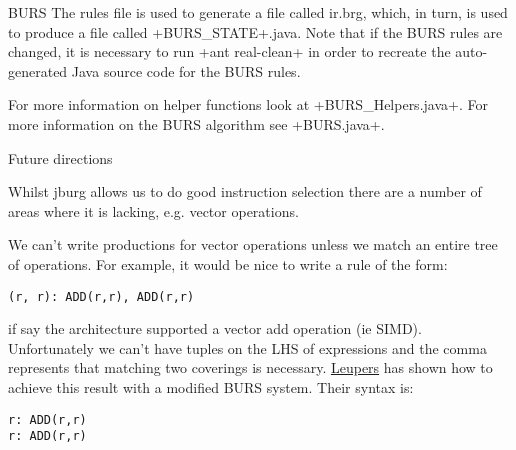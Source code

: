 \begin{subsection}{BURS}
The rules file is used to generate a file called ir.brg, which, in turn, is used to produce a file called \spverb+BURS_STATE+.java. Note that if the BURS rules are changed, it is necessary to run \spverb+ant real-clean+ in order to recreate the auto-generated Java source code for the BURS rules.

For more information on helper functions look at \spverb+BURS_Helpers.java+. For more information on the BURS algorithm see \spverb+BURS.java+.

\begin{paragraph}{Future directions}

Whilst jburg allows us to do good instruction selection there are a number of areas where it is lacking, e.g. vector operations.

We can't write productions for vector operations unless we match an entire tree of operations. For example, it would be nice to write a rule of the form:

\begin{lstlisting}
(r, r): ADD(r,r), ADD(r,r)
\end{lstlisting}

if say the architecture supported a vector add operation (ie SIMD). Unfortunately we can't have tuples on the LHS of expressions and the comma represents that matching two coverings is necessary. \href{http://doi.acm.org/10.1145/343647.343679}{Leupers} has shown how to achieve this result with a modified BURS system. Their syntax is:

\begin{lstlisting}
r: ADD(r,r)
r: ADD(r,r)
\end{lstlisting}

\end{paragraph}

\end{subsection}
